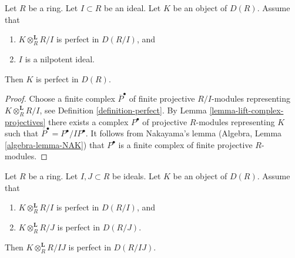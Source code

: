 \begin{lemma}
\label{lemma-perfect-modulo-nilpotent-ideal}
Let $R$ be a ring. Let $I \subset R$ be an ideal.
Let $K$ be an object of $D(R)$. Assume that
\begin{enumerate}
\item $K \otimes_R^\mathbf{L} R/I$ is perfect in $D(R/I)$, and
\item $I$ is a nilpotent ideal.
\end{enumerate}
Then $K$ is perfect in $D(R)$.
\end{lemma}

\begin{proof}
Choose a finite complex $\overline{P}^\bullet$ of finite projective
$R/I$-modules representing $K \otimes_R^\mathbf{L} R/I$, see
Definition \ref{definition-perfect}. By
Lemma \ref{lemma-lift-complex-projectives}
there exists a complex $P^\bullet$ of projective $R$-modules
representing $K$ such that $\overline{P}^\bullet = P^\bullet/IP^\bullet$.
It follows from Nakayama's lemma (Algebra, Lemma \ref{algebra-lemma-NAK})
that $P^\bullet$ is a finite complex of finite projective
$R$-modules.
\end{proof}

\begin{lemma}
\label{lemma-perfect-modulo-two-ideals}
Let $R$ be a ring. Let $I, J \subset R$ be ideals.
Let $K$ be an object of $D(R)$. Assume that
\begin{enumerate}
\item $K \otimes_R^\mathbf{L} R/I$ is perfect in $D(R/I)$, and
\item $K \otimes_R^\mathbf{L} R/J$ is perfect in $D(R/J)$.
\end{enumerate}
Then $K \otimes_R^\mathbf{L} R/IJ$ is perfect in $D(R/IJ)$.
\end{lemma}

